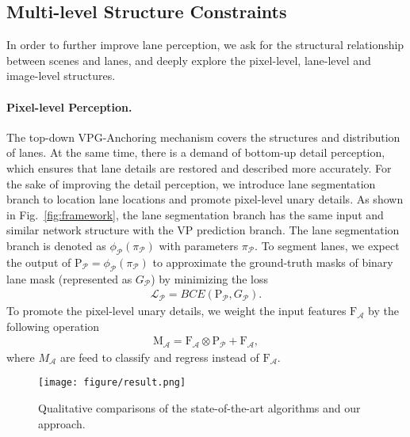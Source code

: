 \documentclass{article}
\begin{document}
\subsection{Multi-level Structure Constraints}
In order to further improve lane perception, we ask for the structural relationship between scenes and lanes, and deeply explore the pixel-level, lane-level and image-level structures.

\paragraph{Pixel-level Perception.}
The top-down VPG-Anchoring mechanism covers the structures and distribution of lanes. At the same time, there is a demand of bottom-up detail perception, which ensures that lane details are restored and described more accurately. For the sake of improving the detail perception, we introduce lane segmentation branch to location lane locations and promote pixel-level unary details. As shown in Fig.~\ref{fig:framework}, the lane segmentation branch has the same input and similar network structure with the VP prediction branch. The lane segmentation branch is denoted as $\phi_{\mathcal{P}}({\pi_\mathcal{P}})$ with parameters $\pi_\mathcal{P}$. To segment lanes, we expect the output of $\text{P}_{\mathcal{P}} = \phi_{\mathcal{P}}({\pi_\mathcal{P}})$ to approximate the ground-truth masks of binary lane mask (represented as $G_{\mathcal{P}}$) by minimizing the loss
\begin{equation}\label{eq:pixel-level_loss}
\begin{aligned}
{\mathcal{L}}_{\mathcal{P}} = BCE(\text{P}_{\mathcal{P}}, G_{\mathcal{P}}).
\end{aligned}
\end{equation}
To promote the pixel-level unary details, we weight the input features $\text{F}_{\mathcal{A}}$ by the following operation
\begin{equation}\label{eq:Delta_x}
\begin{aligned}
\text{M}_{\mathcal{A}} = \text{F}_{\mathcal{A}} \otimes \text{P}_{\mathcal{P}} + \text{F}_{\mathcal{A}},
\end{aligned}
\end{equation}
where $M_{\mathcal{A}}$ are feed to classify and regress instead of $\text{F}_{\mathcal{A}}$.

\begin{figure*}[t]
\centering
\texttt{[image: figure/result.png]}
\caption{Qualitative comparisons of the state-of-the-art algorithms and our approach.}
\label{fig:result}
\end{figure*}
\end{document}
